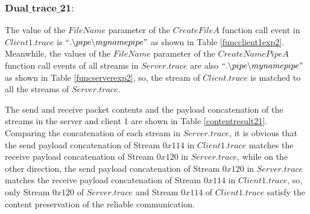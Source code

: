 \documentclass[12pt,oneside]{book}
\begin{document}
\subsubsection{$\boldsymbol{Dual\_trace\_21:}$}
The value of the $FileName$ parameter of the $CreateFileA$ function call event in $Client1.trace$ is $``.\backslash pipe \backslash mynamepipe"$ as shown in Table \ref{funcclient1exp2}. Meanwhile, the values of the $FileName$ parameter of the $CreateNamePipeA$ function call events of all streams in $Server.trace$ are also $``.\backslash pipe \backslash mynamepipe"$ as shown in Table \ref{funcserverexp2}, so, the stream of $Client.trace$ is matched to all the streams of $Server.trace$.

The send and receive packet contents and the payload concatenation of the streams in the server and client 1 are shown in Table \ref{contentresult21}. Comparing the concatenation of each stream in $Server.trace$, it is obvious that the send payload concatenation of Stream $0x114$ in $Client1.trace$ matches the receive payload concatenation of Stream $0x120$ in $Server.trace$, while on the other direction, the send payload concatenation of Stream $0x120$ in $Server.trace$ matches the receive payload concatenation of Stream $0x114$ in $Client1.trace$, so, only Stream $0x120$ of $Server.trace$ and Stream $0x114$ of $Client1.trace$ satisfy the content preservation of the reliable communication. 
\end{document}
